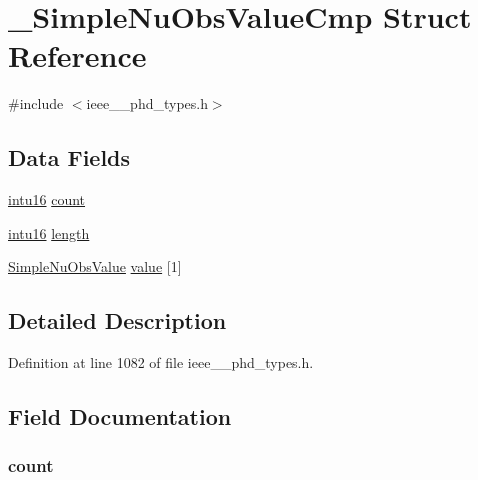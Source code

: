 \hypertarget{struct___simple_nu_obs_value_cmp}{}\section{\+\_\+\+Simple\+Nu\+Obs\+Value\+Cmp Struct Reference}
\label{struct___simple_nu_obs_value_cmp}


{\ttfamily \#include $<$ieee\+\_\+\_\+phd\+\_\+types.\+h$>$}

\subsection*{Data Fields}
\begin{DoxyCompactItemize}
\item 
\hyperlink{ieee__11073__phd__types_8h_a3561595d2aa7416532e1c9910abd076d}{intu16} \hyperlink{struct___simple_nu_obs_value_cmp_abf6db060ae8e224764b0f867fb135ecd}{count}
\item 
\hyperlink{ieee__11073__phd__types_8h_a3561595d2aa7416532e1c9910abd076d}{intu16} \hyperlink{struct___simple_nu_obs_value_cmp_a3743679e4ff85e3e1b3fc2e59973fbb3}{length}
\item 
\hyperlink{ieee__11073__phd__types_8h_a6bf3b861ed6a7bb85157d5b7b53df20e}{Simple\+Nu\+Obs\+Value} \hyperlink{struct___simple_nu_obs_value_cmp_af23e5cfe90144c672a660defcb9d52b9}{value} \mbox{[}1\mbox{]}
\end{DoxyCompactItemize}


\subsection{Detailed Description}


Definition at line 1082 of file ieee\+\_\+\_\+phd\+\_\+types.\+h.



\subsection{Field Documentation}
\hypertarget{struct___simple_nu_obs_value_cmp_abf6db060ae8e224764b0f867fb135ecd}{}
\subsubsection[{count}]{ count}\label{struct___simple_nu_obs_value_cmp_abf6db060ae8e224764b0f867fb135ecd}



